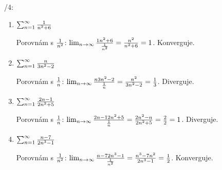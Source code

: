 
\BeginDoc{}
\def\posloup{$\zs{a_n}_{n=1}^{\infty}$}
\def\pos#1{\zs{#1}_{n=1}^{\infty}}
\def\li{\lim_{n\rightarrow\infty}}
\def\sup{{\rm sup\ }}
\def\sciwinfup{{\rm inf\ }}
\def\su{\sum_{n=1}^{\infty}}

/4:

\begin{enumerate}
	\item $\su \f 1{n^2+6}$

		Porovnám s $\frac 1{n^2}$:
		$\li \f{1{n^2+6}}{\f1{n^2}} = \f{n^2}{n^2+6} = 1$.
		Konverguje.
	\item $\su \f n{3n^2-2}$

		Porovnám s $\frac 1{n}$:
		$\li \f{n{3n^2-2}}{\f1{n}} = \f{n^2}{3n^2-2} = \f 13$.
		Diverguje.
	\item $\su \f {2n-1}{2n^2+5}$

		Porovnám s $\frac 1{n}$:
		$\li \f{{2n-1}{2n^2+5}}{\f1{n}} = \f{2n^2-n}{2n^2+5} = \f 22 = 1$.
		Diverguje.
	\item $\su \f {n-7}{2n^3-1}$

		Porovnám s $\frac 1{n^2}$:
		$\li \f{{n-7}{2n^3-1}}{\f1{n^2}} = \f{n^3-7n^2}{2n^3-1} = \f 12$.
		Konverguje.
\end{enumerate}


\EndDoc

